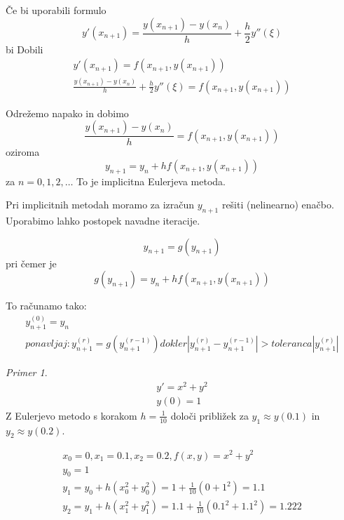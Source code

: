 \documentclass[a4paper,12pt]{article}
\theoremstyle{definition}
\theoremstyle{remark}
\newtheorem*{ex}{Primer}
\begin{document}
Če bi uporabili formulo
\begin{equation*}
    y'(x_{n+1}) = \frac{y(x_{n+1})-y(x_n)}{h} + \frac{h}{2} y''(\xi)
\end{equation*}
bi Dobili
\begin{gather*}
    y'(x_{n+1}) = f(x_{n+1}, y(x_{n+1})) \\
    \frac{y(x_{n+1})-y(x_n)}{h} + \frac{h}{2} y''(\xi) = f(x_{n+1}, y(x_{n+1}))
\end{gather*}

Odrežemo napako in dobimo
\begin{equation*}
    \frac{y(x_{n+1})-y(x_n)}{h} = f(x_{n+1}, y(x_{n+1}))
\end{equation*}
oziroma
\begin{equation*}
    y_{n+1} = y_n + h f(x_{n+1}, y(x_{n+1}))
\end{equation*}
za $n = 0, 1, 2, \dots$ To je implicitna Eulerjeva metoda.

Pri implicitnih metodah moramo za izračun $y_{n+1}$ rešiti (nelinearno) enačbo. Uporabimo lahko postopek navadne iteracije.

\begin{equation*}
    y_{n+1} = g(y_{n+1})
\end{equation*}
pri čemer je
\begin{equation*}
    g(y_{n+1}) = y_n + h f(x_{n+1}, y(x_{n+1}))
\end{equation*}

To računamo tako:
\begin{gather*}
    y_{n+1}^{(0)} = y_n \\
    ponavljaj:
        y_{n+1}^{(r)} = g(y_{n+1}^{(r-1)})
    dokler \left| y_{n+1}^{(r)} - y_{n+1}^{(r-1)} \right| > toleranca \left| y_{n+1}^{(r)} \right|
\end{gather*}


\begin{ex}
    \begin{gather*}
        y' = x^2 + y^2 \\
        y(0) = 1
    \end{gather*}
    Z Eulerjevo metodo s korakom $h = \frac{1}{10}$ določi približek za $y_1 \approx y(0.1)$ in $y_2 \approx y(0.2)$.

    \begin{gather*}
        x_0 = 0, x_1 = 0.1, x_2 = 0.2, f(x, y) = x^2 + y^2 \\
        y_0 = 1 \\
        y_1 = y_0 + h(x_0^2 + y_0^2) = 1 + \frac{1}{10}(0 + 1^2) = 1.1 \\
        y_2 = y_1 + h(x_1^2 + y_1^2) = 1.1 + \frac{1}{10}(0.1^2 + 1.1^2) = 1.222
    \end{gather*}
\end{ex}
\end{document}
